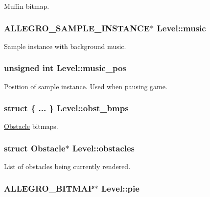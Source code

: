\-Muffin bitmap. \hypertarget{structLevel_a41c6aae8f508e078b02c291e1d6f8e67}{
\subsubsection[{music}]{\setlength{\rightskip}{0pt plus 5cm}\-A\-L\-L\-E\-G\-R\-O\-\_\-\-S\-A\-M\-P\-L\-E\-\_\-\-I\-N\-S\-T\-A\-N\-C\-E$\ast$ {\bf \-Level\-::music}}}\label{structLevel_a41c6aae8f508e078b02c291e1d6f8e67}
\-Sample instance with background music. \hypertarget{structLevel_a13e322deb3298846260af31324e5b492}{
\subsubsection[{music\-\_\-pos}]{\setlength{\rightskip}{0pt plus 5cm}unsigned int {\bf \-Level\-::music\-\_\-pos}}}\label{structLevel_a13e322deb3298846260af31324e5b492}
\-Position of sample instance. \-Used when pausing game. \hypertarget{structLevel_aeb52cb0b931eae0233dd1b50f2c02bf2}{
\subsubsection[{obst\-\_\-bmps}]{\setlength{\rightskip}{0pt plus 5cm}struct \{ ... \}   {\bf \-Level\-::obst\-\_\-bmps}}}\label{structLevel_aeb52cb0b931eae0233dd1b50f2c02bf2}
\hyperlink{structObstacle}{\-Obstacle} bitmaps. \hypertarget{structLevel_a4b4ac826580c681b588dae8ae0dde418}{
\subsubsection[{obstacles}]{\setlength{\rightskip}{0pt plus 5cm}struct {\bf \-Obstacle}$\ast$ {\bf \-Level\-::obstacles}}}\label{structLevel_a4b4ac826580c681b588dae8ae0dde418}
\-List of obstacles being currently rendered. \hypertarget{structLevel_a8910f05e860fca85c96ae45633cc244d}{
\subsubsection[{pie}]{\setlength{\rightskip}{0pt plus 5cm}\-A\-L\-L\-E\-G\-R\-O\-\_\-\-B\-I\-T\-M\-A\-P$\ast$ {\bf \-Level\-::pie}}}\label{structLevel_a8910f05e860fca85c96ae45633cc244d}
